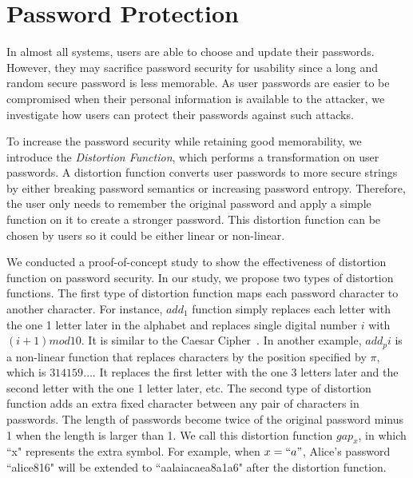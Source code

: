 \section{Password Protection}
\label{passwordprotection}
In almost all systems, users are able to choose and update their passwords. However, they
may sacrifice password security for usability since a long and random secure password is
less memorable.
As user passwords are easier to be compromised when their personal
information is available to the attacker, we investigate how users
can protect their passwords against such attacks.


To increase the password security while retaining good memorability, we introduce
the {\em Distortion Function}, which performs a transformation on user
passwords. A distortion function converts user passwords to more
secure strings by either breaking password semantics or increasing
password entropy. Therefore, the user only needs to remember the
original password and apply a simple function on it to create a stronger
password. This distortion function can be chosen by users so it could
be either linear or non-linear.

We conducted a proof-of-concept study to show the effectiveness of
distortion function on password security. In our study, we propose two
types of distortion functions. 
%
The first type of distortion function maps each password character to
another character. For instance, {\em $add_1$} function simply replaces
each letter with the one 1 letter later in the alphabet and replaces
single digital number $i$ with $(i+1) mod 10$. It is similar to the
Caesar Cipher~\cite{kaufman-textbook}. In another example, {\em $add_pi$}
is a non-linear function that replaces characters by the position
specified by $\pi$, which is $314159 \ldots$. It replaces the first
letter with the one 3 letters later and the second letter with the one
1 letter later, etc.
%
The second type of distortion function adds an extra fixed character
between any pair of characters in passwords. The length of passwords
become twice of the original password minus 1 when the length is
larger than 1. We call this distortion function {\em $gap_x$}, in which
``x" represents the extra symbol. For example, when $x = ``a"$, Alice's
password ``alice816" will be extended to ``aalaiacaea8a1a6" after the
distortion function. 

